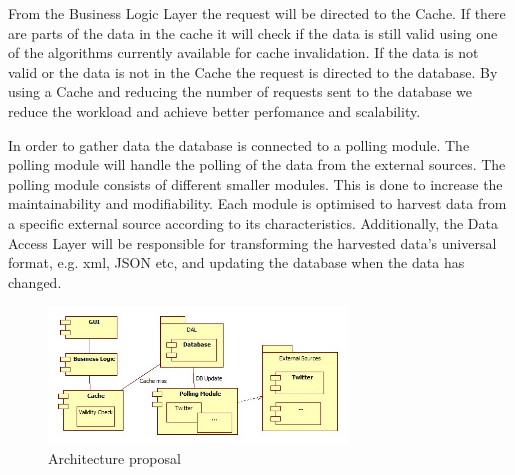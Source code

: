 \documentclass{article}
\begin{document}
From the Business Logic Layer the request will be directed to the
Cache. If there are parts of the data in the cache it will check if the data is
still valid using one of the algorithms currently available for cache
invalidation. If the data is not valid or the data is not in the Cache the
request is directed to the database. By using a Cache and reducing the number
of requests sent to the database we reduce the workload and achieve better
perfomance and scalability.

In order to gather data the database is connected to a polling module. The
polling module will handle the polling of the data from the external sources.
The polling module consists of different smaller modules. This is done to increase the maintainability and modifiability.
Each module is optimised to harvest data from a specific external source according to its
characteristics. Additionally, the Data Access Layer will be responsible for transforming the
harvested data's universal format, e.g. xml, JSON etc, and updating the database when the data has changed.

\begin{figure}[!]
\centering
\includegraphics[width=300px]{ProposedSolution}
\caption{Architecture proposal}
\label{fig:fig6}
\end{figure}


\newpage

\nocite{*}


\end{document}
